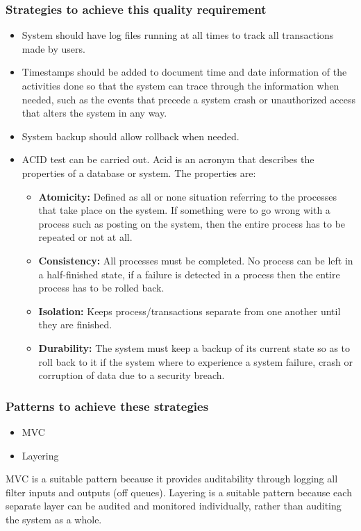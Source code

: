 \documentclass[a4paper,12pt]{article}
\begin{document}
 \subsubsection{Strategies to achieve this quality requirement}
 \begin{itemize}
 \item System should have log files running at all times to track all transactions made by users. 
 \item Timestamps should be added to document time and date information of the activities done so that the system can trace through the information when needed, such as the events that precede a system crash or unauthorized access
that alters the system in any way.
\item System backup should allow rollback when needed.
\item ACID test can be carried out. Acid is an acronym that describes the properties of a database or system. The properties are:
	\begin{itemize}
	\item \textbf{Atomicity:} Defined as all or none situation referring to the processes that take place on the 
	   system. If something were to go wrong with a process such as posting on the system,
	   then the entire process has to be repeated or not at all.
	\item \textbf{Consistency:} All processes must be completed. No process can be left in a half-finished state,
	     if a failure is detected in a process then the entire process has to be rolled back.
	\item \textbf{Isolation:} Keeps process/transactions separate from one another until they are finished.
	\item \textbf{Durability:} The system must keep a backup of its current state so as to roll back to it if
	    the system where to experience a system failure, crash or corruption of data due
	    to a security breach.
	\end{itemize}
 \end{itemize}

 \subsubsection{Patterns to achieve these strategies}
 \begin{itemize}
 \item MVC
 \item Layering
\end{itemize} 
 MVC is a suitable pattern because it provides auditability through logging all filter inputs and outputs (off queues). Layering is a suitable pattern because each separate layer can be audited and monitored individually, rather than auditing the system as a whole.
  
\end{document}
